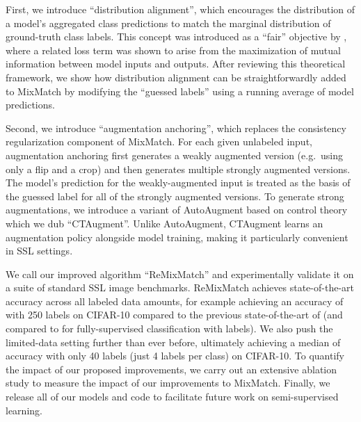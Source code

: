 \documentclass{article} \usepackage{iclr2020_conference,times}
\begin{document}
First, we introduce ``distribution alignment'', which encourages the distribution of a model's aggregated class predictions to match the marginal distribution of ground-truth class labels.
This concept was introduced as a ``fair'' objective by \cite{bridle1992unsupervised}, where a related loss term was shown to arise from the maximization of mutual information between model inputs and outputs.
After reviewing this theoretical framework, we show how distribution alignment can be straightforwardly added to MixMatch by modifying the ``guessed labels'' using a running average of model predictions.

Second, we introduce ``augmentation anchoring'', which replaces the consistency regularization component of MixMatch.
For each given unlabeled input, augmentation anchoring first generates a weakly augmented version (e.g.\ using only a flip and a crop) and then generates multiple strongly augmented versions.
The model's prediction for the weakly-augmented input is treated as the basis of the guessed label for all of the strongly augmented versions.
To generate strong augmentations, we introduce a variant of AutoAugment \citep{cubuk2018autoaugment} based on control theory which we dub ``CTAugment''.
Unlike AutoAugment, CTAugment learns an augmentation policy alongside model training, making it particularly convenient in SSL settings.

We call our improved algorithm ``ReMixMatch'' and experimentally validate it on a suite of standard SSL image benchmarks.
ReMixMatch achieves state-of-the-art accuracy across all labeled data amounts, 
for example achieving an accuracy of  with 250 labels on CIFAR-10 compared to the previous state-of-the-art of  (and compared to  for fully-supervised classification with  labels).
We also push the limited-data setting further than ever before, ultimately achieving a median of  accuracy with only 40 labels (just 4 labels per class) on CIFAR-10.
To quantify the impact of our proposed improvements, we carry out an extensive ablation study to measure the impact of our improvements to MixMatch.
Finally, we release all of our models and code to facilitate future work on semi-supervised learning.
\end{document}
